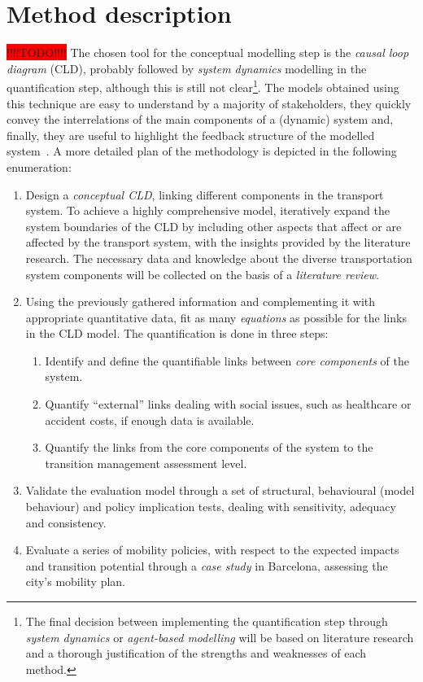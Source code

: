 \documentclass[a4paper,fontsize=11pt,bibliography=totoc]{scrartcl}
\begin{document}
\section{Method description}
\colorbox{red}{!!!!TODO!!!!}
The chosen tool for the conceptual modelling step is the \textit{causal loop diagram} (CLD), probably followed by \textit{system dynamics} modelling in the quantification step, although this is still not clear\footnote{The final decision between implementing the quantification step through \textit{system dynamics} or \textit{agent-based modelling} will be based on literature research and a thorough justification of the strengths and weaknesses of each method.}. The models obtained using this technique are easy to understand by a majority of stakeholders, they quickly convey the interrelations of the main components of a (dynamic) system and, finally, they are useful to highlight the feedback structure of the modelled system~\parencite{ghosh2015_DynamicSystemsEveryone}. A more detailed plan of the methodology is depicted in the following enumeration:
%
\begin{enumerate}[label=(\alph*)]
	\item Design a \textit{conceptual CLD}, linking different components in the transport system. To achieve a highly comprehensive model, iteratively expand the system boundaries of the CLD by including other aspects that affect or are affected by the transport system, with the insights provided by the literature research. The necessary data and knowledge about the diverse transportation system components will be collected on the basis of a \textit{literature review}.
	\item Using the previously gathered information and complementing it with appropriate quantitative data, fit as many \textit{equations} as possible for the links in the CLD model. The quantification is done in three steps:
	\begin{enumerate}[label=\roman*.]
		\item Identify and define the quantifiable links between \textit{core components} of the system.
		\item Quantify ``external'' links dealing with social issues, such as healthcare or accident costs, if enough data is available.
		\item Quantify the links from the core components of the system to the transition management assessment level.
	\end{enumerate}
	\item Validate the evaluation model through a set of structural, behavioural (model behaviour) and policy implication tests, dealing with sensitivity, adequacy and consistency.
	\item Evaluate a series of mobility policies, with respect to the expected impacts and transition potential through a \textit{case study} in Barcelona, assessing the city's mobility plan.
\end{enumerate}
\end{document}

